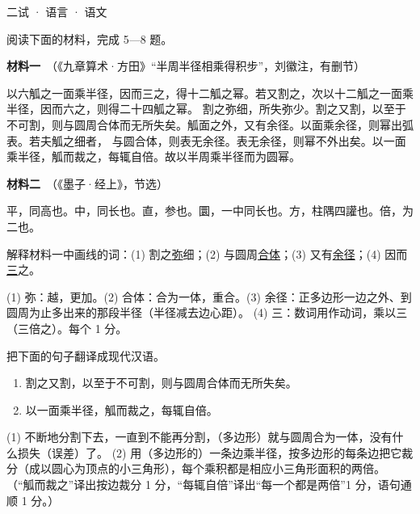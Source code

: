 \documentclass[cjk=noto, seal=first]{mojing-exam}
\begin{document}
\begin{paper}[time={建议 2 小时（训练设置）}, full=100]{二试 · 语言 · 语文}

阅读下面的材料，完成 5—8 题。

\textbf{材料一}　（《九章算术·方田》“半周半径相乘得积步”，刘徽注，有删节）

{\kaishu\hspace{2em}以六觚之一面乘半径，因而三之，得十二觚之幂。若又割之，次以十二觚之一面乘半径，因而六之，则得二十四觚之幂。
割之弥细，所失弥少。割之又割，以至于不可割，则与圆周合体而无所失矣。觚面之外，又有余径。以面乘余径，则幂出弧表。若夫觚之细者，
与圆合体，则表无余径。表无余径，则幂不外出矣。以一面乘半径，觚而裁之，每辄自倍。故以半周乘半径而为圆幂。\par}

\textbf{材料二}　（《墨子·经上》，节选）

{\kaishu\hspace{2em}平，同高也。\quad 中，同长也。\quad 直，参也。\quad 圜，一中同长也。\quad 方，柱隅四讙也。\quad 倍，为二也。\par}

\smallskip
{}

\begin{questions}
\question[4] 解释材料一中画线的词：(1) 割之\underline{弥}细；(2) 与圆周\underline{合体}；(3) 又有\underline{余径}；(4) 因而\underline{三}之。
\answerspace{2cm}
\begin{solution}
(1) 弥：越，更加。(2) 合体：合为一体，重合。(3) 余径：正多边形一边之外、到圆周为止多出来的那段半径（半径减去边心距）。
(4) 三：数词用作动词，乘以三（三倍之）。每个 1 分。
\end{solution}

\question[6] 把下面的句子翻译成现代汉语。
\begin{enumerate}
  \item 割之又割，以至于不可割，则与圆周合体而无所失矣。
  \item 以一面乘半径，觚而裁之，每辄自倍。
\end{enumerate}
\answerspace{3cm}
\begin{solution}
(1) 不断地分割下去，一直到不能再分割，（多边形）就与圆周合为一体，没有什么损失（误差）了。
(2) 用（多边形的）一条边乘半径，按多边形的每条边把它裁分（成以圆心为顶点的小三角形），每个乘积都是相应小三角形面积的两倍。
（“觚而裁之”译出按边裁分 1 分，“每辄自倍”译出“每一个都是两倍”1 分，语句通顺 1 分。）
\end{solution}


\end{questions}
\end{paper}
\end{document}
